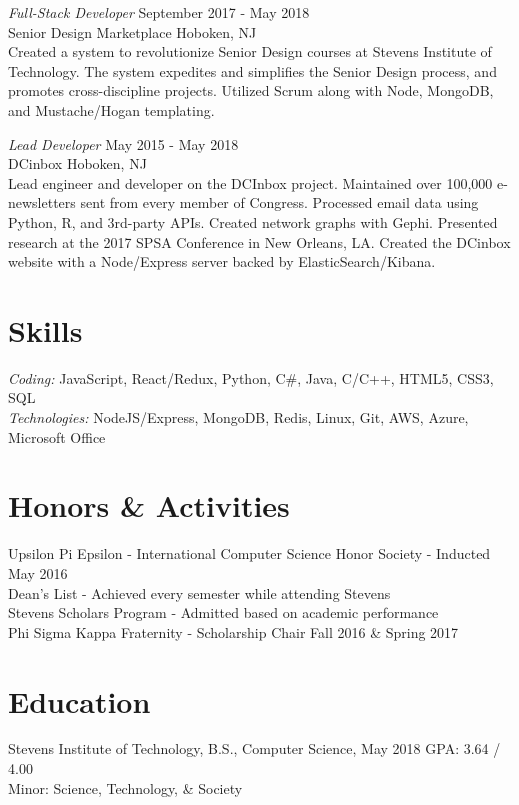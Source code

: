 \documentclass{res}
\begin{document}
{{\sl Full-Stack Developer} \hfill September 2017 - May 2018 \\
Senior Design Marketplace \hfill Hoboken, NJ \\
Created a system to revolutionize Senior Design courses at Stevens Institute of Technology. The system expedites and simplifies the Senior Design process, and promotes cross-discipline projects. Utilized Scrum along with Node, MongoDB, and Mustache/Hogan templating.

{\sl Lead Developer} \hfill May 2015 - May 2018 \\
DCinbox \hfill Hoboken, NJ \\
Lead engineer and developer on the DCInbox project. Maintained over 100,000 e-newsletters sent from every member of Congress. Processed email data using Python, R, and 3rd-party APIs. Created network graphs with Gephi. Presented research at the 2017 SPSA Conference in New Orleans, LA. Created the DCinbox website with a Node/Express server backed by ElasticSearch/Kibana.

\section{\bf\large Skills}
{\sl Coding: } JavaScript, React/Redux, Python, C\#, Java, C/C++, HTML5, CSS3, SQL \\
{\sl Technologies:} NodeJS/Express, MongoDB, Redis, Linux, Git, AWS, Azure, Microsoft Office

\section{\bf\large Honors \& Activities}
Upsilon Pi Epsilon - International Computer Science Honor Society - Inducted May 2016\\
Dean's List - Achieved every semester while attending Stevens \\
Stevens Scholars Program - Admitted based on academic performance \\
Phi Sigma Kappa Fraternity - Scholarship Chair Fall 2016 \& Spring 2017

\section{\bf\large Education}
Stevens Institute of Technology, B.S., Computer Science, May 2018 \hfill GPA: 3.64 / 4.00 \\
Minor: Science, Technology, \& Society \\

}
\end{document}
